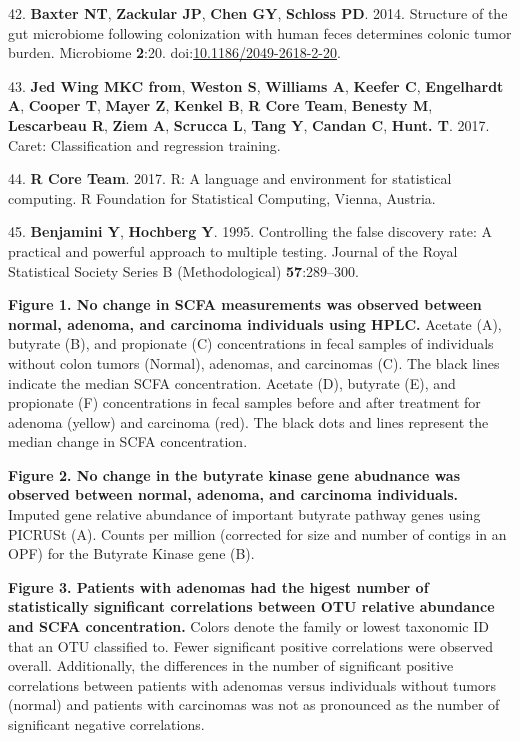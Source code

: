 \documentclass[11pt,]{article}
\begin{document}
\hypertarget{ref-scfa_baxter2014}{}
42. \textbf{Baxter NT}, \textbf{Zackular JP}, \textbf{Chen GY},
\textbf{Schloss PD}. 2014. Structure of the gut microbiome following
colonization with human feces determines colonic tumor burden.
Microbiome \textbf{2}:20.
doi:\href{https://doi.org/10.1186/2049-2618-2-20}{10.1186/2049-2618-2-20}.

\hypertarget{ref-caret_citation}{}
43. \textbf{Jed Wing MKC from}, \textbf{Weston S}, \textbf{Williams A},
\textbf{Keefer C}, \textbf{Engelhardt A}, \textbf{Cooper T},
\textbf{Mayer Z}, \textbf{Kenkel B}, \textbf{R Core Team},
\textbf{Benesty M}, \textbf{Lescarbeau R}, \textbf{Ziem A},
\textbf{Scrucca L}, \textbf{Tang Y}, \textbf{Candan C}, \textbf{Hunt.
T}. 2017. Caret: Classification and regression training.

\hypertarget{ref-r_citation_2017}{}
44. \textbf{R Core Team}. 2017. R: A language and environment for
statistical computing. R Foundation for Statistical Computing, Vienna,
Austria.

\hypertarget{ref-benjamini_controlling_1995}{}
45. \textbf{Benjamini Y}, \textbf{Hochberg Y}. 1995. Controlling the
false discovery rate: A practical and powerful approach to multiple
testing. Journal of the Royal Statistical Society Series B
(Methodological) \textbf{57}:289--300.

\newpage

\textbf{Figure 1. No change in SCFA measurements was observed between
normal, adenoma, and carcinoma individuals using HPLC.} Acetate (A),
butyrate (B), and propionate (C) concentrations in fecal samples of
individuals without colon tumors (Normal), adenomas, and carcinomas (C).
The black lines indicate the median SCFA concentration. Acetate (D),
butyrate (E), and propionate (F) concentrations in fecal samples before
and after treatment for adenoma (yellow) and carcinoma (red). The black
dots and lines represent the median change in SCFA concentration.

\textbf{Figure 2. No change in the butyrate kinase gene abudnance was
observed between normal, adenoma, and carcinoma individuals.} Imputed
gene relative abundance of important butyrate pathway genes using
PICRUSt (A). Counts per million (corrected for size and number of
contigs in an OPF) for the Butyrate Kinase gene (B).

\textbf{Figure 3. Patients with adenomas had the higest number of
statistically significant correlations between OTU relative abundance
and SCFA concentration.} Colors denote the family or lowest taxonomic ID
that an OTU classified to. Fewer significant positive correlations were
observed overall. Additionally, the differences in the number of
significant positive correlations between patients with adenomas versus
individuals without tumors (normal) and patients with carcinomas was not
as pronounced as the number of significant negative correlations.
\end{document}

